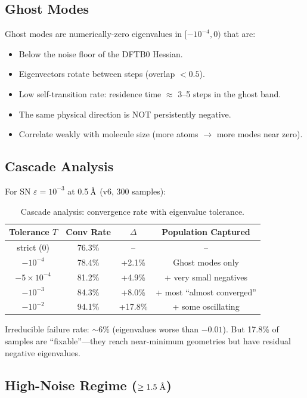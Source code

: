 \documentclass[11pt,a4paper]{article}
\newcommand{\angstrom}{\text{\r{A}}}
\begin{document}
\subsection{Ghost Modes}
\label{sec:ghost-modes}

Ghost modes are numerically-zero eigenvalues in $[-10^{-4}, 0)$ that are:
\begin{itemize}
  \item Below the noise floor of the DFTB0 Hessian.
  \item Eigenvectors rotate between steps (overlap $< 0.5$).
  \item Low self-transition rate: residence time $\approx$ 3--5 steps in the ghost band.
  \item The same physical direction is NOT persistently negative.
  \item Correlate weakly with molecule size (more atoms $\to$ more modes near zero).
\end{itemize}

\subsection{Cascade Analysis}
\label{sec:cascade}

For SN $\varepsilon = 10^{-3}$ at 0.5\,$\angstrom$ (v6, 300 samples):

\begin{table}[H]
\centering
\caption{Cascade analysis: convergence rate with eigenvalue tolerance.}
\label{tab:cascade}
\begin{tabular}{cccc}
\toprule
Tolerance $T$ & Conv Rate & $\Delta$ & Population Captured \\
\midrule
strict (0) & 76.3\% & -- & -- \\
$-10^{-4}$ & 78.4\% & +2.1\% & Ghost modes only \\
$-5\times10^{-4}$ & 81.2\% & +4.9\% & + very small negatives \\
$-10^{-3}$ & 84.3\% & +8.0\% & + most ``almost converged'' \\
$-10^{-2}$ & 94.1\% & +17.8\% & + some oscillating \\
\bottomrule
\end{tabular}
\end{table}

Irreducible failure rate: $\sim$6\% (eigenvalues worse than $-0.01$). But 17.8\% of samples are ``fixable''---they reach near-minimum geometries but have residual negative eigenvalues.

\subsection{High-Noise Regime ($\geq 1.5\;\angstrom$)}
\end{document}
